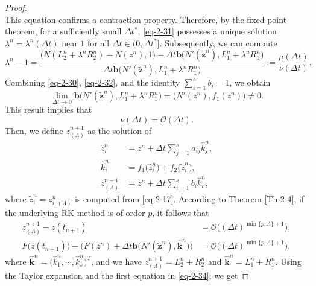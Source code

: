 \documentclass[10pt,a4paper]{amsart}
\begin{document}
\begin{proof}
\begin{equation*}
\end{equation*}	
This equation confirms a contraction property. Therefore, by the fixed-point theorem, for a sufficiently small $\Delta t^*$, \eqref{eq-2-31} possesses a unique solution $\lambda^n=\lambda^n(\Delta t)$ near $1$ for all $\Delta t\in(0,\Delta t^*]$. Subsequently, we can compute
\begin{equation}\label{eq-2-33}
	\lambda^n-1=\frac{\big(N(L_2^n+\lambda^nR_2^n)-N(z^n),1\big)-\Delta t\textbf{b}\big(N'(\tilde{\textbf{z}}^n),L_1^n+\lambda^nR_1^n\big)}{\Delta t\textbf{b}\big(N'(\tilde{\textbf{z}}^n),L_1^n+\lambda^nR_1^n\big)}:=\frac{\mu(\Delta t)}{\nu(\Delta t)}.
\end{equation}
Combining \eqref{eq-2-30}, \eqref{eq-2-32}, and the identity $\sum_{i=1}^s b_i = 1$, we obtain
\begin{equation*}
	\lim_{\Delta t\rightarrow 0}\textbf{b}\big(N'(\tilde{\textbf{z}}^n),L_1^n+\lambda^nR_1^n\big)=\big(N'(z^n),f_1(z^n)\big)\neq0.
\end{equation*}	
This result implies that
\begin{equation*}
	\nu(\Delta t)=\mathcal{O}(\Delta t).
\end{equation*}
Then, we define $z_{(\Lambda)}^{n+1}$ as the solution of
\begin{equation*}
	\begin{aligned}
		\hat{z}_i^n&=z^n+\Delta t\sum_{j=1}^sa_{ij}\hat{k}_j^n,\\
		\hat{k}_i^n&=f_1\big(\hat{z}_i^n\big)+f_2\big(\tilde{z}_i^n\big),\\
		z_{(\Lambda)}^{n+1}&=z^n+\Delta t\sum_{i=1}^sb_i\hat{k}_i^n,
	\end{aligned}
\end{equation*}
where $\tilde{z}_i^n=z_{i,(\Lambda)}^n$ is computed from \eqref{eq-2-17}. According to Theorem \ref{Th-2-4}, if the underlying RK method is of order $p$, it follows that
\begin{equation}\label{eq-2-34}
	\begin{aligned}
		z_{(\Lambda)}^{n+1}-z(t_{n+1})&=\mathcal{O}\big((\Delta t)^{\min\{p,\Lambda\}+1}\big),\\
		F\big(z(t_{n+1})\big)-\big(F(z^n)+\Delta t\textbf{b}\big(N'(\tilde{\textbf{z}}^n),\hat{\textbf{k}}^n\big)\big)&=\mathcal{O}\big((\Delta t)^{\min\{p,\Lambda\}+1}\big),
    \end{aligned}
\end{equation}	
where $\hat{\textbf{k}}^n=\big(\hat{k}_1^n,\cdots,\hat{k}_s^n\big)^T$, and we have $z_{(\Lambda)}^{n+1}=L_2^n+R_2^n$ and $\hat{\textbf{k}}^n=L_1^n+R_1^n$. Using the Taylor expansion and the first equation in \eqref{eq-2-34}, we get

\end{proof}
\end{document}
